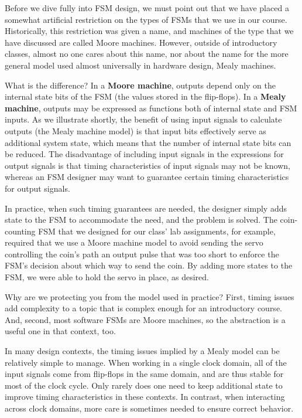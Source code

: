 Before we dive fully into FSM design, we must point out that we have
placed a somewhat artificial restriction on the types of FSMs that
we use in our course.
%
Historically, this restriction was given a name, and machines of the type
that we have discussed are called Moore machines.
%
However, outside of introductory classes, almost no one cares about
this name, nor about the name for the more general model used almost
universally in hardware design, Mealy machines.

What is the difference?  In a {\bf Moore machine}, outputs depend only on
the internal state bits of the FSM (the values stored in the flip-flops).
In a {\bf Mealy machine}, outputs
may be expressed as functions both of internal state and FSM inputs.
%
As we illustrate shortly, the benefit of using input signals to calculate
outputs (the Mealy machine model) is that input bits effectively serve 
as additional system state, which means that the number of internal 
state bits can be reduced.
%
The disadvantage of including input signals in the expressions for 
output signals is that timing characteristics of input signals may not
be known, whereas an FSM designer may want to guarantee certain
timing characteristics for output signals.

In practice, when such timing guarantees are needed, the designer simply
adds state to the FSM to accommodate the need, and the problem is solved.
%
The coin-counting FSM that we designed for our class' lab assignments,
for example, 
required that we use a Moore machine model to avoid sending the
servo controlling the coin's path an output pulse that was too short
to enforce the FSM's decision about which way to send the coin.
%
By adding more states to the FSM, we were able to hold the servo in
place, as desired.

Why are we protecting you from the model used in practice?
%
First, timing issues add complexity to a topic that is complex enough 
for an introductory course.
%
And, second, most software FSMs are Moore machines, so the abstraction
is a useful one in that context, too.

In many design contexts, the timing issues implied by a Mealy model
can be relatively simple to manage.  When working in a single clock
domain, all of the input signals come from flip-flops in the same 
domain, and are thus stable for most of the clock cycle.  Only rarely
does one need to keep additional state to improve timing characteristics
in these contexts.  In contrast, when interacting across clock domains,
more care is sometimes needed to ensure correct behavior.

